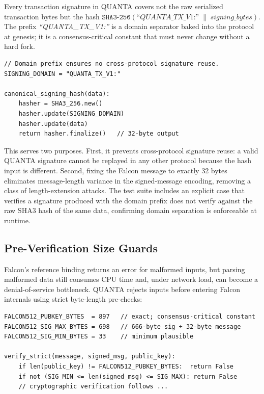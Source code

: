 \documentclass[11pt,a4paper]{article}
\begin{document}
Every transaction signature in QUANTA covers not the raw serialized
transaction bytes but the hash
$\texttt{SHA3-256}(\textit{``QUANTA\_TX\_V1:''} \;\|\; \textit{signing\_bytes})$.
The prefix \textit{``QUANTA\_TX\_V1:''} is a domain separator baked into the
protocol at genesis; it is a consensus-critical constant that must never
change without a hard fork.

\begin{lstlisting}[caption={Canonical signing hash construction.}]
// Domain prefix ensures no cross-protocol signature reuse.
SIGNING_DOMAIN = "QUANTA_TX_V1:"

canonical_signing_hash(data):
    hasher = SHA3_256.new()
    hasher.update(SIGNING_DOMAIN)
    hasher.update(data)
    return hasher.finalize()   // 32-byte output
\end{lstlisting}

This serves two purposes. First, it prevents cross-protocol signature reuse: a
valid QUANTA signature cannot be replayed in any other protocol because the
hash input is different. Second, fixing the Falcon message to exactly 32 bytes
eliminates message-length variance in the signed-message encoding, removing a
class of length-extension attacks. The test suite includes an explicit case
that verifies a signature produced with the domain prefix does not verify
against the raw SHA3 hash of the same data, confirming domain separation is
enforceable at runtime.

\subsection{Pre-Verification Size Guards}

Falcon's reference binding returns an error for malformed inputs, but parsing
malformed data still consumes CPU time and, under network load, can become a
denial-of-service bottleneck. QUANTA rejects inputs before entering Falcon
internals using strict byte-length pre-checks:

\begin{lstlisting}[caption={Strict length bounds enforced before cryptographic verification.}]
FALCON512_PUBKEY_BYTES  = 897   // exact; consensus-critical constant
FALCON512_SIG_MAX_BYTES = 698   // 666-byte sig + 32-byte message
FALCON512_SIG_MIN_BYTES = 33    // minimum plausible

verify_strict(message, signed_msg, public_key):
    if len(public_key) != FALCON512_PUBKEY_BYTES:  return False
    if not (SIG_MIN <= len(signed_msg) <= SIG_MAX): return False
    // cryptographic verification follows ...
\end{lstlisting}
\end{document}
